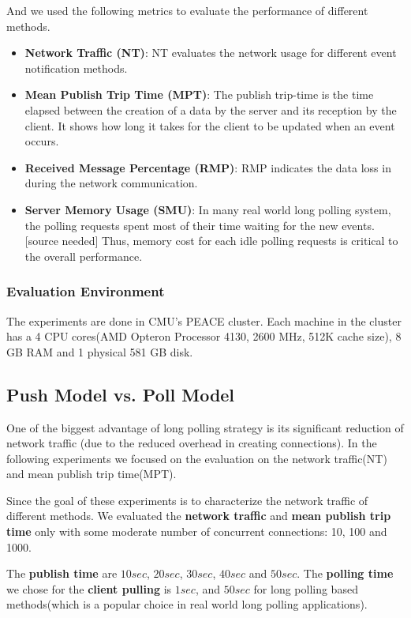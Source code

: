 And we used the following metrics to evaluate the performance of different
methods.
\begin{itemize}
    \item {\bf Network Traffic (NT)}: NT evaluates the network usage for
        different event notification methods.
    \item {\bf Mean Publish Trip Time (MPT)}: The publish trip-time is 
        the time elapsed between the creation of a data by the server and 
        its reception by the client. It shows how long it takes for the 
        client to be updated when an event occurs.
    \item {\bf Received Message Percentage (RMP)}: RMP indicates the data 
        loss in during the network communication. 
    \item {\bf Server Memory Usage (SMU)}: In many real world long polling 
        system, the polling requests spent most of their time waiting for 
        the new events.[source needed] Thus, memory cost for each idle 
        polling requests is critical to the overall performance.
\end{itemize}

\subsubsection{Evaluation Environment \\}
The experiments are done in CMU's PEACE cluster. Each machine in the cluster 
has a 4 CPU cores(AMD Opteron Processor 4130, 2600 MHz, 512K cache size),
8 GB RAM and 1 physical 581 GB disk.

\subsection{Push Model vs. Poll Model\\}

One of the biggest advantage of long polling strategy is its significant 
reduction of network traffic (due to the reduced overhead in creating connections).
In the following experiments we focused on the evaluation on the network 
traffic(NT) and mean publish trip time(MPT).

Since the goal of these experiments is to characterize the network traffic 
of different methods. We evaluated the {\bf network traffic} and {\bf mean 
publish trip time} only with some moderate number of concurrent 
connections: 10, 100 and 1000. 

The {\bf publish time} are $10 sec$, $20 sec$, $30 sec$, $40 sec$ and 
$50 sec$. The {\bf polling time} we chose for the {\bf client pulling}
is $1 sec$, and $50 sec$ for long polling based methods(which is a 
popular choice in real world long polling applications).

